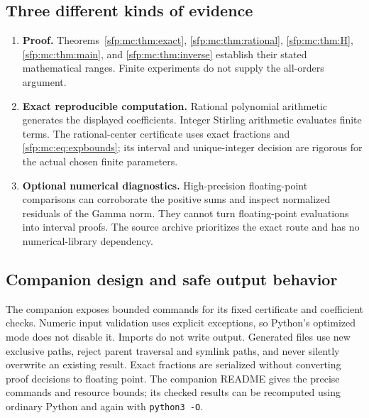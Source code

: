 \documentclass[11pt,letterpaper]{article}
\numberwithin{equation}{section}
\theoremstyle{definition}\newtheorem{definition}[theorem]{Definition}
\theoremstyle{remark}\newtheorem{remark}[theorem]{Remark}
\begin{document}
\subsection{Three different kinds of evidence}
\begin{enumerate}
\item \textbf{Proof.} Theorems~\ref{sfp:mc:thm:exact},
\ref{sfp:mc:thm:rational}, \ref{sfp:mc:thm:H}, \ref{sfp:mc:thm:main}, and
\ref{sfp:mc:thm:inverse} establish their stated mathematical ranges.
Finite experiments do not supply the all-orders argument.
\item \textbf{Exact reproducible computation.} Rational polynomial
arithmetic generates the displayed coefficients. Integer Stirling
arithmetic evaluates finite terms. The rational-center certificate
uses exact fractions and \eqref{sfp:mc:eq:expbounds}; its interval and
unique-integer decision are rigorous for the actual chosen
finite parameters.
\item \textbf{Optional numerical diagnostics.} High-precision
floating-point comparisons can corroborate the positive sums and
inspect normalized residuals of the Gamma norm. They cannot turn
floating-point evaluations into interval proofs. The source archive
prioritizes the exact route and has no numerical-library dependency.
\end{enumerate}

\subsection{Companion design and safe output behavior}
The companion exposes bounded commands for its fixed certificate
and coefficient checks. Numeric input validation uses explicit
exceptions, so Python's optimized mode does not disable it.
Imports do not write output. Generated files use new exclusive
paths, reject parent traversal and symlink paths, and never
silently overwrite an existing result. Exact fractions are
serialized without converting proof decisions to floating point.
The companion README gives the precise commands and resource
bounds; its checked results can be recomputed using ordinary
Python and again with \texttt{python3 -O}.
\end{document}
